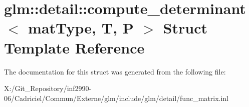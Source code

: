 \hypertarget{structglm_1_1detail_1_1compute__determinant}{\section{glm\-:\-:detail\-:\-:compute\-\_\-determinant$<$ mat\-Type, T, P $>$ Struct Template Reference}
\label{structglm_1_1detail_1_1compute__determinant}
}


The documentation for this struct was generated from the following file\-:\begin{DoxyCompactItemize}
\item 
X\-:/\-Git\-\_\-\-Repository/inf2990-\/06/\-Cadriciel/\-Commun/\-Externe/glm/include/glm/detail/func\-\_\-matrix.\-inl\end{DoxyCompactItemize}
